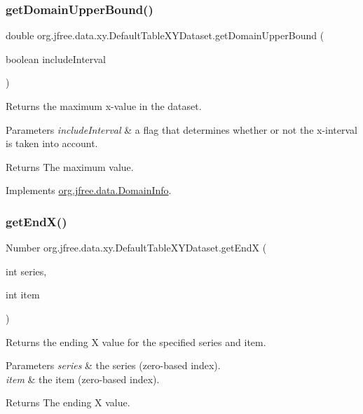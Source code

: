 \subsubsection{\texorpdfstring{get\+Domain\+Upper\+Bound()}{getDomainUpperBound()}}
{\footnotesize\ttfamily double org.\+jfree.\+data.\+xy.\+Default\+Table\+X\+Y\+Dataset.\+get\+Domain\+Upper\+Bound (\begin{DoxyParamCaption}\item[{boolean}]{include\+Interval }\end{DoxyParamCaption})}

Returns the maximum x-\/value in the dataset.


\begin{DoxyParams}{Parameters}
{\em include\+Interval} & a flag that determines whether or not the x-\/interval is taken into account.\\
\hline
\end{DoxyParams}
\begin{DoxyReturn}{Returns}
The maximum value. 
\end{DoxyReturn}


Implements \mbox{\hyperlink{interfaceorg_1_1jfree_1_1data_1_1_domain_info_a00e455f8db5bd8515266000cacc74e89}{org.\+jfree.\+data.\+Domain\+Info}}.

\mbox{\label{classorg_1_1jfree_1_1data_1_1xy_1_1_default_table_x_y_dataset_a12b2af8de53dfdcd8fec99d1c1b304b2}} 
\subsubsection{\texorpdfstring{get\+End\+X()}{getEndX()}}
{\footnotesize\ttfamily Number org.\+jfree.\+data.\+xy.\+Default\+Table\+X\+Y\+Dataset.\+get\+EndX (\begin{DoxyParamCaption}\item[{int}]{series,  }\item[{int}]{item }\end{DoxyParamCaption})}

Returns the ending X value for the specified series and item.


\begin{DoxyParams}{Parameters}
{\em series} & the series (zero-\/based index). \\
\hline
{\em item} & the item (zero-\/based index).\\
\hline
\end{DoxyParams}
\begin{DoxyReturn}{Returns}
The ending X value. 
\end{DoxyReturn}


